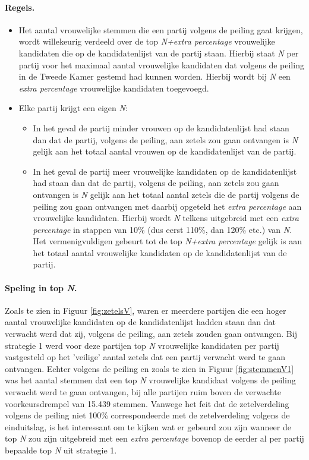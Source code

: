 \paragraph{Regels.}
\begin{itemize}
	\item
Het aantal vrouwelijke stemmen die een partij volgens de peiling gaat krijgen, wordt willekeurig verdeeld over de top \textit{N+extra percentage} vrouwelijke kandidaten die op de kandidatenlijst van de partij staan. Hierbij staat \textit{N} per partij voor het maximaal aantal vrouwelijke kandidaten dat volgens de peiling in de Tweede Kamer gestemd had kunnen worden. Hierbij wordt bij \textit{N} een \textit{extra percentage} vrouwelijke kandidaten toegevoegd.\\
 	\item
Elke partij krijgt een eigen \textit{N}:
	\begin{itemize}
		\item
In het geval de partij minder vrouwen op de kandidatenlijst had staan dan dat de partij, volgens de peiling, aan zetels zou gaan ontvangen is \textit{N} gelijk aan het totaal aantal vrouwen op de kandidatenlijst van de partij.
		\item
In het geval de partij meer vrouwelijke kandidaten op de kandidatenlijst had staan dan dat de partij, volgens de peiling, aan zetels zou gaan ontvangen is \textit{N} gelijk aan het totaal aantal zetels die de partij volgens de peiling zou gaan ontvangen met daarbij opgeteld het \textit{extra percentage} aan vrouwelijke kandidaten. Hierbij wordt \textit{N} telkens uitgebreid met een \textit{extra percentage} in stappen van 10\% (dus eerst 110\%, dan 120\% etc.) van \textit{N}. Het vermenigvuldigen gebeurt tot de top \textit{N+extra percentage} gelijk is aan het totaal aantal vrouwelijke kandidaten op de kandidatenlijst van de partij. 
\end{itemize} 	
\end{itemize}

\paragraph{Speling in top \textit{N}.}
Zoals te zien in Figuur \ref{fig:zetelsV}, waren er meerdere partijen die een hoger aantal vrouwelijke kandidaten op de kandidatenlijst hadden staan dan dat verwacht werd dat zij,  volgens de peiling, aan zetels zouden gaan ontvangen. Bij strategie 1 werd voor deze partijen top \textit{N} vrouwelijke kandidaten per partij vastgesteld op het 'veilige' aantal zetels dat een partij verwacht werd te gaan ontvangen. Echter volgens de peiling en zoals te zien in Figuur \ref{fig:stemmenV1} was het aantal stemmen dat een top \textit{N} vrouwelijke kandidaat volgens de peiling verwacht werd te gaan ontvangen, bij alle partijen ruim boven de verwachte voorkeursdrempel van 15.439 stemmen. Vanwege het feit dat de zetelverdeling volgens de peiling niet 100\% correspondeerde met de zetelverdeling volgens de einduitslag, is het interessant om te kijken wat er gebeurd zou zijn wanneer de top \textit{N} zou zijn uitgebreid met een \textit{extra percentage} bovenop de eerder al per partij bepaalde top \textit{N} uit strategie 1. 

